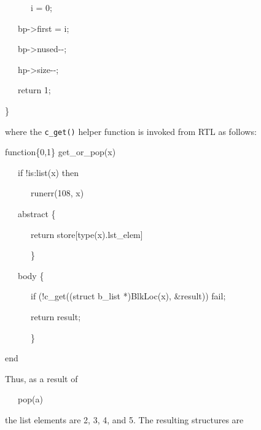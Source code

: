 {\ttfamily\mdseries
\ \ \ \ \ \ i = 0;}

{\ttfamily\mdseries
\ \ \ bp-{\textgreater}first = i;}

{\ttfamily\mdseries
\ \ \ bp-{\textgreater}nused-{}-;}

{\ttfamily\mdseries
\ \ \ hp-{\textgreater}size-{}-;}

{\ttfamily\mdseries
\ \ \ return 1;}

{\ttfamily\mdseries
\}}


where the \texttt{c\_get()} helper function is invoked from RTL as follows:

{\ttfamily\mdseries
function\{0,1\} get\_or\_pop(x)}

{\ttfamily\mdseries
\ \ \ if !is:list(x) then}

{\ttfamily\mdseries
\ \ \ \ \ \ runerr(108, x)}


\bigskip

{\ttfamily\mdseries
\ \ \ abstract \{}

{\ttfamily\mdseries
\ \ \ \ \ \ return store[type(x).lst\_elem]}

{\ttfamily\mdseries
\ \ \ \ \ \ \}}


\bigskip

{\ttfamily\mdseries
\ \ \ body \{}

{\ttfamily\mdseries
\ \ \ \ \ \ if (!c\_get((struct b\_list *)BlkLoc(x), \&result)) fail;}

{\ttfamily\mdseries
\ \ \ \ \ \ return result;}

{\ttfamily\mdseries
\ \ \ \ \ \ \}}

{\ttfamily\mdseries
end}


Thus, as a result of

{\ttfamily\mdseries
\ \ \ pop(a)}

\noindent
the list elements are 2, 3, 4, and 5. The resulting structures are


